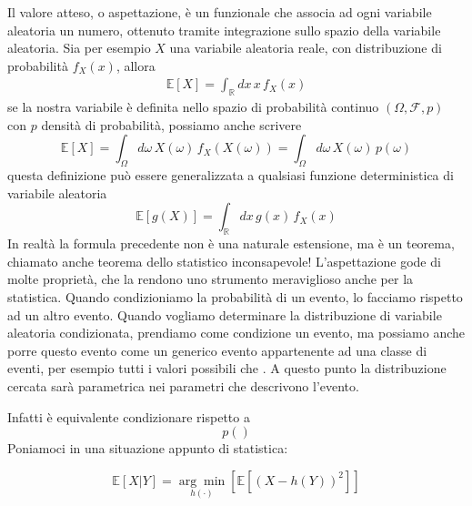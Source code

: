 \documentclass[10pt, article]{article}
\begin{document}
Il valore atteso, o aspettazione, è un funzionale che associa ad ogni variabile aleatoria un numero, ottenuto tramite integrazione sullo spazio della variabile aleatoria. Sia per esempio $X$ una variabile aleatoria reale, con distribuzione di probabilità $f_X(x)$, allora
\begin{align} 
	\mathbb{E}\left[X\right] = \int_{\mathbb{R}} dx \, x \, f_X(x)
\end{align}
se la nostra variabile è definita nello spazio di probabilità continuo $(\Omega, \mathcal{F}, p)$ con $p$ densità di probabilità, possiamo anche scrivere
\begin{equation}
	\mathbb{E}\left[X\right] = \int_{\Omega} d\omega \, X(\omega) \, f_X(X(\omega)) = \int_{\Omega} d\omega \, X(\omega) \, p(\omega)
\end{equation}
questa definizione può essere generalizzata a qualsiasi funzione deterministica di variabile aleatoria
\begin{equation}
	\mathbb{E}\left[g(X)\right] = \int_{\mathbb{R}}dx \, g(x) \, f_X(x)
\end{equation}
In realtà la formula precedente non è una naturale estensione, ma è un teorema, chiamato anche teorema dello statistico inconsapevole!
L'aspettazione gode di molte proprietà, che la rendono uno strumento meraviglioso anche per la statistica.
Quando condizioniamo la probabilità di un evento, lo facciamo rispetto ad un altro evento. Quando vogliamo determinare la distribuzione di variabile aleatoria condizionata, prendiamo come condizione un evento, ma possiamo anche porre questo evento come un generico evento appartenente ad una classe di eventi, per esempio tutti i valori possibili che . A questo punto la distribuzione cercata sarà parametrica nei parametri che descrivono l'evento.


Infatti è equivalente condizionare rispetto a 
\begin{equation}
	p()
\end{equation}
Poniamoci in una situazione appunto di statistica:

\begin{equation} 
	\mathbb{E}\left[X|Y\right] = \underset{h(\cdot)}{\arg \min} \left[\mathbb{E}\left[(X - h(Y))^2\right]\right]
\end{equation}
\end{document}
